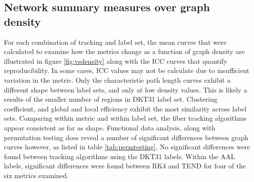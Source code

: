 \documentclass{frontiersSCNS} %
\begin{document}
\subsection{Network summary measures over graph density}
For each combination of tracking and label set, the mean curves that were calculated to examine how the metrics change as a 
function of graph density are illustrated in figure
\ref{fig:vsdensity} along with the ICC curves that quantify
reproducibility. In some cases, ICC values may not be calculate due to
insufficient variation in the metric.
Only the characteristic path length curves exhibit a different shape between label sets, and
only at low density values. This is likely a results of the smaller number of regions in DKT31 label set. Clustering coefficient, and
global and local efficiency exhibit the most similarity across label sets. Comparing within metric and within label set, the fiber tracking
algorithms appear consistent as far as shape. Functional data analysis, along with permutation testing does reveal a number of significant
differences between graph curves however, as listed in table \ref{tab:permtesting}. No significant differences were found between 
tracking algorithms using the DKT31 labels. Within the AAL labels, significant differences were found between RK4 and TEND for four 
of the six metrics examined.
\end{document}
